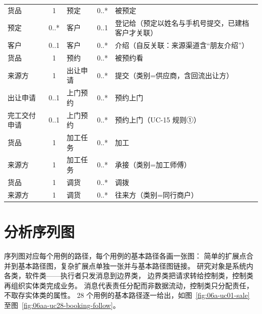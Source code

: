 \begin{table}[H]
\begin{tabularx}{\textwidth}{@{}l c l c Y@{}}
货品 & 1 & 预定 & 0..* & 被预定 \\
预定 & 0..* & 客户 & 0..1 & 登记给（预定以姓名与手机号提交，已建档客户才关联） \\
客户 & 0..1 & 客户 & 0..* & 介绍（自反关联：来源渠道含“朋友介绍”） \\
货品 & 1 & 预约 & 0..* & 被预约看 \\
来源方 & 1 & 出让申请 & 0..* & 提交（类别=供应商，含回流出让方） \\
出让申请 & 0..1 & 上门预约 & 0..* & 预约上门 \\
完工交付申请 & 0..1 & 上门预约 & 0..* & 预约上门（UC-15 规则①） \\
货品 & 1 & 加工任务 & 0..* & 加工 \\
来源方 & 1 & 加工任务 & 0..* & 承接（类别=加工师傅） \\
货品 & 1 & 调货 & 0..* & 调拨 \\
来源方 & 1 & 调货 & 0..* & 往来方（类别=同行商户） \\
\bottomrule
\end{tabularx}
\end{table}

\section{分析序列图}

序列图对应每个用例的路径，每个用例的基本路径各画一张图：
简单的扩展点合并到基本路径图，复杂扩展点单独一张并与基本路径图链接。
研究对象是系统内各类，软件类——执行者只发消息到边界类，
边界类把请求转给控制类，控制类再组织实体类完成业务。
消息代表责任分配而非数据流动，控制类只分配责任，不取存实体类的属性。
28 个用例的基本路径逐一给出，如图~\ref{fig:06a-uc01-sale} 至图~\ref{fig:06aa-uc28-booking-follow}。

